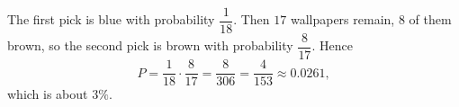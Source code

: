 The first pick is blue with probability $\dfrac{1}{18}$. Then $17$ wallpapers remain, $8$ of them brown, so the second pick is brown with probability $\dfrac{8}{17}$. Hence
\[
P=\dfrac{1}{18}\cdot\dfrac{8}{17}=\dfrac{8}{306}=\boxed{\dfrac{4}{153}}\approx0.0261,
\]
which is about $\boxed{3\%}$.
